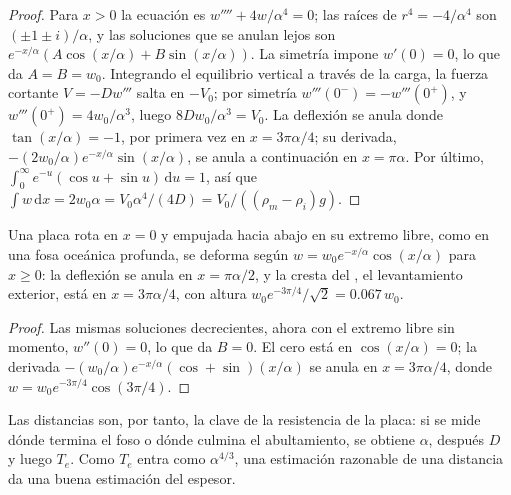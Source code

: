 \begin{proof}
Para $x > 0$ la ecuación es $w'''' + 4w/\alpha^4 = 0$; las raíces de
$r^4 = -4/\alpha^4$ son $(\pm1 \pm i)/\alpha$, y las soluciones que se anulan lejos
son $e^{-x/\alpha}(A\cos(x/\alpha) + B\sin(x/\alpha))$. La simetría impone
$w'(0) = 0$, lo que da $A = B = w_0$. Integrando el equilibrio vertical a través
de la carga, la fuerza cortante $V = -Dw'''$ salta en $-V_0$; por simetría
$w'''(0^-) = -w'''(0^+)$, y $w'''(0^+) = 4w_0/\alpha^3$, luego $8Dw_0/\alpha^3 =
V_0$. La deflexión se anula donde $\tan(x/\alpha) =
-1$, por primera vez en $x = 3\pi\alpha/4$; su derivada,
$-(2w_0/\alpha)e^{-x/\alpha}\sin(x/\alpha)$, se anula a continuación en $x = \pi\alpha$.
Por último, $\int_0^\infty e^{-u}(\cos u + \sin u)\,\mathrm du = 1$, así que
$\int w\,\mathrm dx = 2w_0\alpha = V_0\alpha^4/(4D) = V_0/((\rho_m - \rho_i)g)$.
\end{proof}

\begin{proposition}\label{prop:b3:gravity-geodesy:broken}
Una placa rota en $x = 0$ y empujada hacia abajo en su extremo libre, como en una
fosa oceánica profunda, se deforma según $w = w_0e^{-x/\alpha}\cos(x/\alpha)$ para $x \ge 0$: la
deflexión se anula en $x = \pi\alpha/2$, y la cresta del , el
levantamiento exterior, está en $x = 3\pi\alpha/4$, con altura $w_0e^{-3\pi/4}/\sqrt2 =
\num{0.067}\,w_0$.
\end{proposition}

\begin{proof}
Las mismas soluciones decrecientes, ahora con el extremo libre sin momento,
$w''(0) = 0$, lo que da $B = 0$. El cero está en $\cos(x/\alpha) = 0$; la
derivada $-(w_0/\alpha)e^{-x/\alpha}(\cos + \sin)(x/\alpha)$ se anula en
$x = 3\pi\alpha/4$, donde $w = w_0e^{-3\pi/4}\cos(3\pi/4)$.
\end{proof}

Las distancias son, por tanto, la clave de la resistencia de la placa: si se mide dónde
termina el foso o dónde culmina el abultamiento, se obtiene $\alpha$, después $D$ y luego $T_e$.
Como $T_e$ entra como $\alpha^{4/3}$, una estimación razonable de una distancia da una buena
estimación del espesor.

